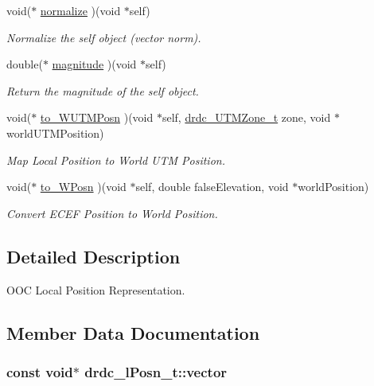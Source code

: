 \begin{CompactItemize}
void($\ast$ \hyperlink{structdrdc__lPosn__t_7709e0a141c76489ce7f3c60e3d457f8}{normalize} )(void $\ast$self)
\begin{CompactList}\small\item\em Normalize the self object (vector norm). \item\end{CompactList}\item 
double($\ast$ \hyperlink{structdrdc__lPosn__t_d7162293346abf921b33d64d5eaa37fc}{magnitude} )(void $\ast$self)
\begin{CompactList}\small\item\em Return the magnitude of the self object. \item\end{CompactList}\item 
void($\ast$ \hyperlink{structdrdc__lPosn__t_061d2b3a1190a967bac4f8520ac93f9c}{to\_\-WUTMPosn} )(void $\ast$self, \hyperlink{structdrdc__UTMZone__t}{drdc\_\-UTMZone\_\-t} zone, void $\ast$worldUTMPosition)
\begin{CompactList}\small\item\em Map Local Position to World UTM Position. \item\end{CompactList}\item 
void($\ast$ \hyperlink{structdrdc__lPosn__t_e620ba6725974a69bb92bf5cee9d3fb7}{to\_\-WPosn} )(void $\ast$self, double falseElevation, void $\ast$worldPosition)
\begin{CompactList}\small\item\em Convert ECEF Position to World Position. \item\end{CompactList}\end{CompactItemize}


\subsection{Detailed Description}
OOC Local Position Representation. 



\subsection{Member Data Documentation}
\hypertarget{structdrdc__lPosn__t_2d9d257a1d0a8f872043d6cde860b819}{
\subsubsection[vector]{\setlength{\rightskip}{0pt plus 5cm}const void$\ast$ {\bf drdc\_\-lPosn\_\-t::vector}}}
\label{structdrdc__lPosn__t_2d9d257a1d0a8f872043d6cde860b819}


